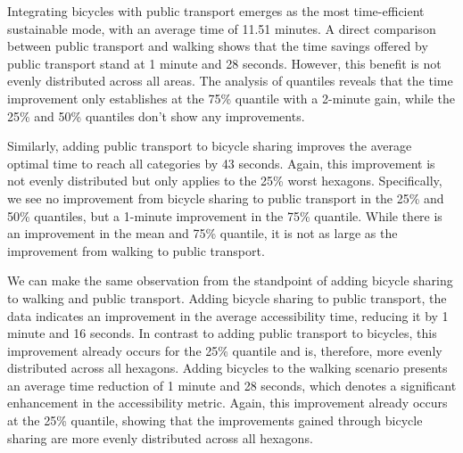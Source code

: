 Integrating bicycles with public transport emerges as the most time-efficient sustainable mode, with an average time of 11.51 minutes. 
A direct comparison between public transport and walking shows that the time savings offered by public transport stand at 1 minute and 28 seconds. 
However, this benefit is not evenly distributed across all areas.
The analysis of quantiles reveals that the time improvement only establishes at the 75\% quantile with a 2-minute gain, while the 25\% and 50\% quantiles don't show any improvements.

Similarly, adding public transport to bicycle sharing improves the average optimal time to reach all categories by 43 seconds.
Again, this improvement is not evenly distributed but only applies to the 25\% worst hexagons.
Specifically, we see no improvement from bicycle sharing to public transport in the 25\% and 50\% quantiles, but a 1-minute improvement in the 75\% quantile.
While there is an improvement in the mean and 75\% quantile, it is not as large as the improvement from walking to public transport.

We can make the same observation from the standpoint of adding bicycle sharing to walking and public transport.
Adding bicycle sharing to public transport, the data indicates an improvement in the average accessibility time, reducing it by 1 minute and 16 seconds.
In contrast to adding public transport to bicycles, this improvement already occurs for the 25\% quantile and is, therefore, more evenly distributed across all hexagons.
Adding bicycles to the walking scenario presents an average time reduction of 1 minute and 28 seconds, which denotes a significant enhancement in the accessibility metric. 
Again, this improvement already occurs at the 25\% quantile, showing that the improvements gained through bicycle sharing are more evenly distributed across all hexagons.

